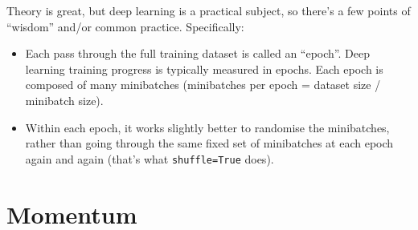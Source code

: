 \documentclass{article}
\newcommand{\bracket}[3]{\left#1 #3 \right#2}
\newcommand{\sqb}{\bracket{[}{]}}
\newcommand{\0}{\mathbf{0}}
\newcommand{\gsfb}{g_\text{fb}}
\newcommand{\gsmb}{g_\text{mb}}
\newcommand{\E}{\operatorname{E}\sqb}
\newcommand{\Var}{\operatorname{Var}\sqb}
\begin{document}

Theory is great, but deep learning is a practical subject, so there's a few points of ``wisdom'' and/or common practice. Specifically:
\begin{itemize}
  \item Each pass through the full training dataset is called an ``epoch''.  Deep learning training progress is typically measured in epochs.  Each epoch is composed of many minibatches (minibatches per epoch = dataset size / minibatch size).
  \item Within each epoch, it works slightly better to randomise the minibatches, rather than going through the same fixed set of minibatches at each epoch again and again (that's what \verb|shuffle=True| does).
\end{itemize}

\section{Momentum}
\end{document}
